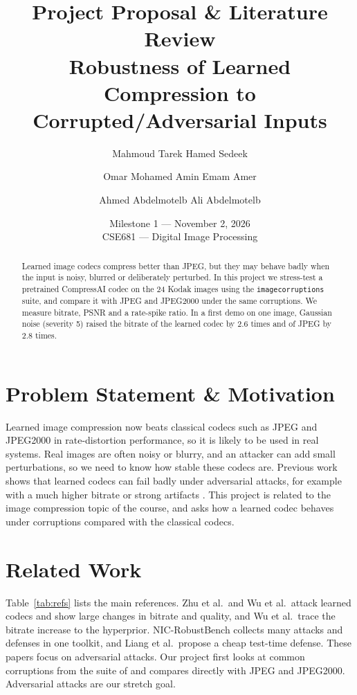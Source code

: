 \documentclass[11pt]{article}
\title{\LARGE Project Proposal \& Literature Review \\[4pt]
\large {Robustness of Learned Compression to Corrupted/Adversarial Inputs}}
\author{
  {Mahmoud Tarek Hamed Sedeek} \and
  {Omar Mohamed Amin Emam Amer} \and
  {Ahmed Abdelmotelb Ali Abdelmotelb}
}
\date{Milestone 1 --- {November 2, 2026} \\{} CSE681 --- Digital Image Processing}
\begin{document}
\maketitle

\begin{abstract}
Learned image codecs compress better than JPEG, but they may behave badly when the input is noisy, blurred or deliberately perturbed. In this project we stress-test a pretrained CompressAI codec on the 24 Kodak images using the \texttt{imagecorruptions} suite, and compare it with JPEG and JPEG2000 under the same corruptions. We measure bitrate, PSNR and a rate-spike ratio. In a first demo on one image, Gaussian noise (severity 5) raised the bitrate of the learned codec by 2.6 times and of JPEG by 2.8 times.
\end{abstract}

\section{Problem Statement \& Motivation}
\label{sec:motivation}
Learned image compression now beats classical codecs such as JPEG and JPEG2000 in rate-distortion performance, so it is likely to be used in real systems. Real images are often noisy or blurry, and an attacker can add small perturbations, so we need to know how stable these codecs are. Previous work shows that learned codecs can fail badly under adversarial attacks, for example with a much higher bitrate or strong artifacts \citep{zhu2024attack,wu2024adversarial}. This project is related to the image compression topic of the course, and asks how a learned codec behaves under corruptions compared with the classical codecs.

\section{Related Work}
\label{sec:related}
Table~\ref{tab:refs} lists the main references. Zhu et al.\ and Wu et al.\ attack learned codecs and show large changes in bitrate and quality, and Wu et al.\ trace the bitrate increase to the hyperprior. NIC-RobustBench collects many attacks and defenses in one toolkit, and Liang et al.\ propose a cheap test-time defense. These papers focus on adversarial attacks. Our project first looks at common corruptions from the suite of \citet{michaelis2019benchmarking} and compares directly with JPEG and JPEG2000. Adversarial attacks are our stretch goal.
\end{document}
